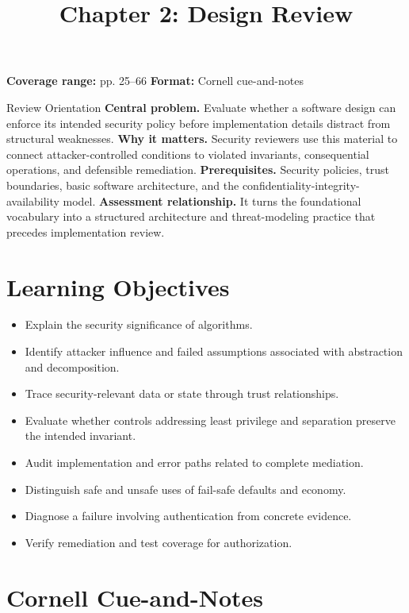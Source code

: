 \documentclass[11pt,letterpaper]{article}
\title{Chapter 2: Design Review}
\author{}
\date{}
\begin{document}
\maketitle

\begin{center}
\small\color{Meta}\textbf{Coverage range:} pp. 25--66 \quad\textbullet\quad \textbf{Format:} Cornell cue-and-notes
\end{center}
\vspace{0.25em}
\begin{CornellOverviewBox}{Review Orientation}
\textbf{Central problem.} Evaluate whether a software design can enforce its intended security policy before implementation details distract from structural weaknesses.
\textbf{Why it matters.} Security reviewers use this material to connect attacker-controlled conditions to violated invariants, consequential operations, and defensible remediation.
\textbf{Prerequisites.} Security policies, trust boundaries, basic software architecture, and the confidentiality-integrity-availability model.
\textbf{Assessment relationship.} It turns the foundational vocabulary into a structured architecture and threat-modeling practice that precedes implementation review.
\end{CornellOverviewBox}
\section{Learning Objectives}
\begin{itemize}
\item Explain the security significance of algorithms.
\item Identify attacker influence and failed assumptions associated with abstraction and decomposition.
\item Trace security-relevant data or state through trust relationships.
\item Evaluate whether controls addressing least privilege and separation preserve the intended invariant.
\item Audit implementation and error paths related to complete mediation.
\item Distinguish safe and unsafe uses of fail-safe defaults and economy.
\item Diagnose a failure involving authentication from concrete evidence.
\item Verify remediation and test coverage for authorization.
\end{itemize}
\section{Cornell Cue-and-Notes}
\end{document}
